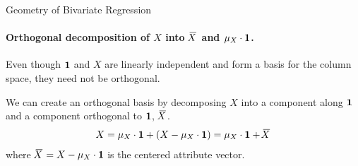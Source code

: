 

\begin{frame}{Geometry of Bivariate Regression}
\framesubtitle{Orthogonal decomposition of $X$ into $\mkern 1.5mu\overline{\mkern-4.0muX}\mkern 1.5mu$ and $\mu_X \cdot    \mathbf{1}$.}

Even though $\mathbf{1}$ and $X$ are linearly independent and form a basis for the column space, they need not be orthogonal. 

\medskip

We can create an orthogonal basis by decomposing $X$ into a component along
$\mathbf{1}$ and a component orthogonal to $\mathbf{1}$, $\mkern 1.5mu\overline{\mkern-4.0muX}\mkern 1.5mu$.
\begin{align*}
    X = \mu_X \cdot \mathbf{1} + (X - \mu_X \cdot \mathbf{1}) = \mu_X \cdot \mathbf{1}
    + \mkern 1.5mu\overline{\mkern-4.0muX}\mkern 1.5mu
\end{align*}
where $\mkern 1.5mu\overline{\mkern-4.0muX}\mkern 1.5mu = X - \mu_X \cdot \mathbf{1}$ is the centered attribute
vector.



\end{frame}
